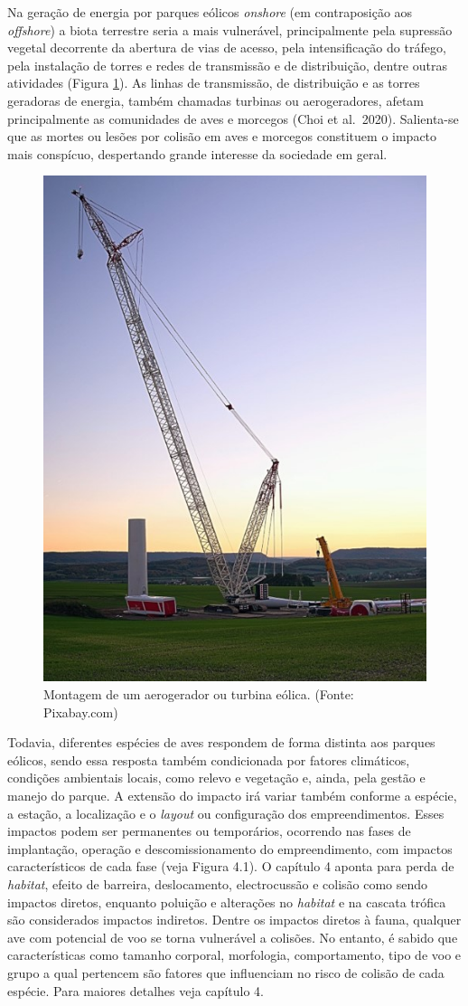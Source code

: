 \documentclass[
  oneside]{scrbook}
\begin{document}
Na geração de energia por parques eólicos \emph{onshore} (em contraposição aos \emph{offshore}) a biota terrestre seria a mais vulnerável, principalmente pela supressão vegetal decorrente da abertura de vias de acesso, pela intensificação do tráfego, pela instalação de torres e redes de transmissão e de distribuição, dentre outras atividades (Figura \ref{fig:18}). As linhas de transmissão, de distribuição e as torres geradoras de energia, também chamadas turbinas ou aerogeradores, afetam principalmente as comunidades de aves e morcegos (Choi et al.~2020). Salienta-se que as mortes ou lesões por colisão em aves e morcegos constituem o impacto mais conspícuo, despertando grande interesse da sociedade em geral.

\begin{figure}[H]

{\centering \includegraphics[width=0.5\linewidth]{imagens/cap06/Figura_6.1} 

}

\caption{Montagem de um aerogerador ou turbina eólica. (Fonte: Pixabay.com)}\label{fig:18}
\end{figure}

Todavia, diferentes espécies de aves respondem de forma distinta aos parques eólicos, sendo essa resposta também condicionada por fatores climáticos, condições ambientais locais, como relevo e vegetação e, ainda, pela gestão e manejo do parque. A extensão do impacto irá variar também conforme a espécie, a estação, a localização e o \emph{layout} ou configuração dos empreendimentos. Esses impactos podem ser permanentes ou temporários, ocorrendo nas fases de implantação, operação e descomissionamento do empreendimento, com impactos característicos de cada fase (veja Figura 4.1). O capítulo 4 aponta para perda de \emph{habitat}, efeito de barreira, deslocamento, electrocussão e colisão como sendo impactos diretos, enquanto poluição e alterações no \emph{habitat} e na cascata trófica são considerados impactos indiretos. Dentre os impactos diretos à fauna, qualquer ave com potencial de voo se torna vulnerável a colisões. No entanto, é sabido que características como tamanho corporal, morfologia, comportamento, tipo de voo e grupo a qual pertencem são fatores que influenciam no risco de colisão de cada espécie. Para maiores detalhes veja capítulo 4.
\end{document}
